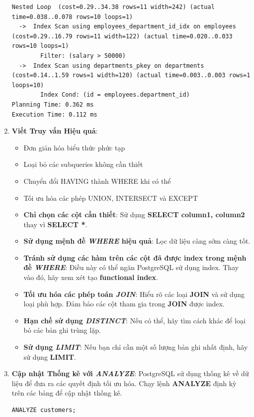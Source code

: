 \begin{enumerate}
\begin{lstlisting}[style=sql, caption=Ví dụ sử dụng EXPLAIN trong Postgres, label=sql:example]
Nested Loop  (cost=0.29..34.38 rows=11 width=242) (actual time=0.038..0.078 rows=10 loops=1)
  ->  Index Scan using employees_department_id_idx on employees  (cost=0.29..16.79 rows=11 width=122) (actual time=0.020..0.033 rows=10 loops=1)
        Filter: (salary > 50000)
  ->  Index Scan using departments_pkey on departments  (cost=0.14..1.59 rows=1 width=120) (actual time=0.003..0.003 rows=1 loops=10)
        Index Cond: (id = employees.department_id)
Planning Time: 0.362 ms
Execution Time: 0.112 ms
\end{lstlisting}
    \item \textbf{Viết Truy vấn Hiệu quả}:
      \begin{itemize}
        \item Đơn giản hóa biểu thức phức tạp
        \item Loại bỏ các subqueries không cần thiết
        \item Chuyển đổi HAVING thành WHERE khi có thể
        \item Tối ưu hóa các phép UNION, INTERSECT và EXCEPT
        \item \textbf{Chỉ chọn các cột cần thiết}: Sử dụng \textbf{SELECT column1, column2} thay vì \textbf{SELECT *}.
        \item \textbf{Sử dụng mệnh đề \textit{WHERE} hiệu quả}: Lọc dữ liệu càng sớm càng tốt.
        \item \textbf{Tránh sử dụng các hàm trên các cột đã được index trong mệnh đề \textit{WHERE}}: Điều này có thể ngăn PostgreSQL sử dụng index. Thay vào đó, hãy xem xét tạo \textbf{functional index}.
        \item \textbf{Tối ưu hóa các phép toán \textit{JOIN}}: Hiểu rõ các loại \textbf{JOIN} và sử dụng loại phù hợp. Đảm bảo các cột tham gia trong \textbf{JOIN} được index.
        \item \textbf{Hạn chế sử dụng \textit{DISTINCT}}: Nếu có thể, hãy tìm cách khác để loại bỏ các bản ghi trùng lặp.
        \item \textbf{Sử dụng \textit{LIMIT}}: Nếu bạn chỉ cần một số lượng bản ghi nhất định, hãy sử dụng \textbf{LIMIT}.
    \end{itemize}
    \item \textbf{Cập nhật Thống kê với \textit{ANALYZE}}: PostgreSQL sử dụng thống kê về dữ liệu để đưa ra các quyết định tối ưu hóa. Chạy lệnh \textbf{ANALYZE} định kỳ trên các bảng để cập nhật thống kê.
\begin{lstlisting}[style=sql, caption=Ví dụ sử dụng ANALYZE trong Postgres, label=sql:example]
ANALYZE customers;
\end{lstlisting}


\end{enumerate}
